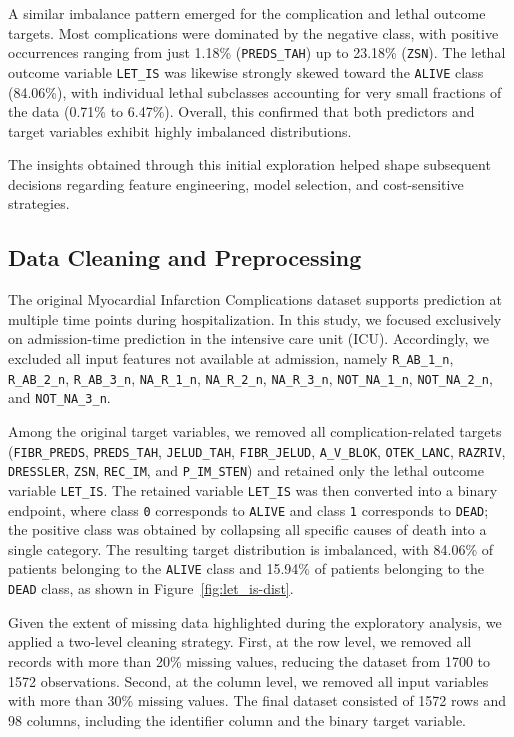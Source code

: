 \documentclass[conference]{IEEEtran}
\begin{document}
A similar imbalance pattern emerged for the complication and lethal outcome targets. Most complications were dominated by the negative class, with positive occurrences ranging from just 1.18\% (\texttt{PREDS\_TAH}) up to 23.18\% (\texttt{ZSN}). The lethal outcome variable \texttt{LET\_IS} was likewise strongly skewed toward the \texttt{ALIVE} class (84.06\%), with individual lethal subclasses accounting for very small fractions of the data (0.71\% to 6.47\%). Overall, this confirmed that both predictors and target variables exhibit highly imbalanced distributions.

The insights obtained through this initial exploration helped shape subsequent decisions regarding feature engineering, model selection, and cost-sensitive strategies.

\subsection{Data Cleaning and Preprocessing}
The original Myocardial Infarction Complications dataset supports prediction at multiple time points during hospitalization. In this study, we focused exclusively on admission-time prediction in the intensive care unit (ICU). Accordingly, we excluded all input features not available at admission, namely \texttt{R\_AB\_1\_n}, \texttt{R\_AB\_2\_n}, \texttt{R\_AB\_3\_n}, \texttt{NA\_R\_1\_n}, \texttt{NA\_R\_2\_n}, \texttt{NA\_R\_3\_n}, \texttt{NOT\_NA\_1\_n}, \texttt{NOT\_NA\_2\_n}, and \texttt{NOT\_NA\_3\_n}.

Among the original target variables, we removed all complication-related targets (\texttt{FIBR\_PREDS}, \texttt{PREDS\_TAH}, \texttt{JELUD\_TAH}, \texttt{FIBR\_JELUD}, \texttt{A\_V\_BLOK}, \texttt{OTEK\_LANC}, \texttt{RAZRIV}, \texttt{DRESSLER}, \texttt{ZSN}, \texttt{REC\_IM}, and \texttt{P\_IM\_STEN}) and retained only the lethal outcome variable \texttt{LET\_IS}. The retained variable \texttt{LET\_IS} was then converted into a binary endpoint, where class \texttt{0} corresponds to \texttt{ALIVE} and class \texttt{1} corresponds to \texttt{DEAD}; the positive class was obtained by collapsing all specific causes of death into a single category. The resulting target distribution is imbalanced, with 84.06\% of patients belonging to the \texttt{ALIVE} class and 15.94\% of patients belonging to the \texttt{DEAD} class, as shown in Figure~\ref{fig:let_is-dist}.

Given the extent of missing data highlighted during the exploratory analysis, we applied a two-level cleaning strategy. First, at the row level, we removed all records with more than 20\% missing values, reducing the dataset from 1700 to 1572 observations. Second, at the column level, we removed all input variables with more than 30\% missing values. The final dataset consisted of 1572 rows and 98 columns, including the identifier column and the binary target variable.
\end{document}
